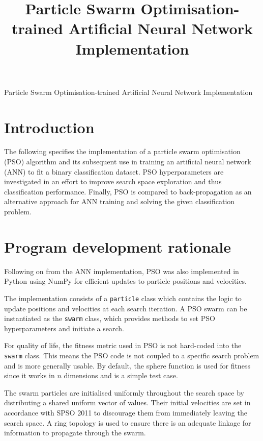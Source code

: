 \documentclass[12pt]{article}
\begin{document}
\title{Particle Swarm Optimisation-trained Artificial Neural Network Implementation}

\begin{center}
  \Large{Particle Swarm Optimisation-trained Artificial Neural Network Implementation}
\end{center}

\vspace{-2em}
\section{Introduction}
\vspace{-1.5em}

The following specifies the implementation of a particle swarm
optimisation (PSO) algorithm and its subsequent use in training an
artificial neural network (ANN) to fit a binary classification dataset.
PSO hyperparameters are investigated in an effort to improve search
space exploration and thus classification performance. Finally, PSO is
compared to back-propagation as an alternative approach for ANN training
and solving the given classification problem.

\vspace{-1.5em}
\section{Program development rationale}
\vspace{-1.5em}

Following on from the ANN implementation, PSO was also implemented in
Python using NumPy for efficient updates to particle positions and velocities.

The implementation consists of a \texttt{particle} class which contains
the logic to update positions and velocities at each search iteration.
A PSO swarm can be instantiated as the \texttt{swarm} class, which provides
methods to set PSO hyperparameters and initiate a search.

For quality of life, the fitness metric used in PSO is not hard-coded
into the \texttt{swarm} class. This means the PSO code is not coupled to
a specific search problem and is more generally usable. By default, the
sphere function is used for fitness since it works in \(n\) dimensions
and is a simple test case.

The swarm particles are initialised uniformly throughout the search space
by distributing a shared uniform vector of values. Their initial velocities
are set in accordance with SPSO 2011 \cite{Clerc} to discourage them from
immediately leaving the search space. A ring topology \cite{Clerc} is used to
ensure there is an adequate linkage for information to propagate through
the swarm.
\end{document}
